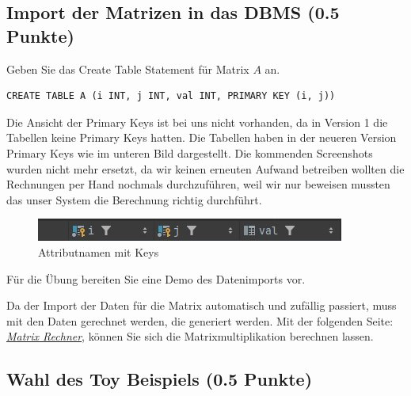 \documentclass[11pt]{scrartcl}
\begin{document}
\subsection*{Import der Matrizen in das DBMS (0.5 Punkte)}

Geben Sie das Create Table Statement für Matrix $A$ an.

\begin{lstlisting}[style=dmrsql]
  CREATE TABLE A (i INT, j INT, val INT, PRIMARY KEY (i, j))
\end{lstlisting}

Die Ansicht der Primary Keys ist bei uns nicht vorhanden, da in Version 1 die Tabellen keine Primary Keys hatten.
Die Tabellen haben in der neueren Version Primary Keys wie im unteren Bild dargestellt.
Die kommenden Screenshots wurden nicht mehr ersetzt, da wir keinen erneuten Aufwand betreiben wollten die Rechnungen per Hand nochmals durchzuführen, weil wir nur beweisen mussten das unser System die Berechnung richtig durchführt.

\begin{figure}[H]
    \begin{center}
        \includegraphics[width=\linewidth]{table_key.jpg}
        \caption{Attributnamen mit Keys}
    \end{center}
\end{figure}

Für die Übung bereiten Sie eine Demo des Datenimports vor.

Da der Import der Daten für die Matrix automatisch und zufällig passiert, muss mit den Daten gerechnet werden, die generiert werden. 
Mit der folgenden Seite: \href{https://matrixcalc.org/de/}{\textit{Matrix Rechner}}, können Sie sich die Matrixmultiplikation berechnen lassen. 

\subsection*{Wahl des Toy Beispiels (0.5 Punkte)}
\end{document}
